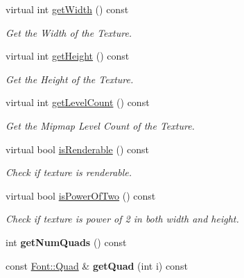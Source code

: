 \begin{DoxyCompactItemize}
\item 
virtual int \hyperlink{class_i_dream_sky_1_1_font_a29554be6eae3bf01854205b373b87d4c}{get\+Width} () const 
\begin{DoxyCompactList}\small\item\em Get the Width of the Texture. \end{DoxyCompactList}\item 
virtual int \hyperlink{class_i_dream_sky_1_1_font_a95544f5096b7b11ed4bd82e5888bf32b}{get\+Height} () const 
\begin{DoxyCompactList}\small\item\em Get the Height of the Texture. \end{DoxyCompactList}\item 
virtual int \hyperlink{class_i_dream_sky_1_1_font_ab31bc3961d87559fb2bec990eb2ea74e}{get\+Level\+Count} () const 
\begin{DoxyCompactList}\small\item\em Get the Mipmap Level Count of the Texture. \end{DoxyCompactList}\item 
virtual bool \hyperlink{class_i_dream_sky_1_1_font_a2925b8c1b04096d45cc37bcce6980599}{is\+Renderable} () const 
\begin{DoxyCompactList}\small\item\em Check if texture is renderable. \end{DoxyCompactList}\item 
virtual bool \hyperlink{class_i_dream_sky_1_1_font_af3cd04a5fad1746998deb5c8f2cb1553}{is\+Power\+Of\+Two} () const 
\begin{DoxyCompactList}\small\item\em Check if texture is power of 2 in both width and height. \end{DoxyCompactList}\item 
int {\bfseries get\+Num\+Quads} () const \hypertarget{class_i_dream_sky_1_1_font_a823b7635f9df8b86502524a00d160ec9}{}\label{class_i_dream_sky_1_1_font_a823b7635f9df8b86502524a00d160ec9}

\item 
const \hyperlink{class_i_dream_sky_1_1_font_1_1_quad}{Font\+::\+Quad} \& {\bfseries get\+Quad} (int i) const \hypertarget{class_i_dream_sky_1_1_font_aa1e6b0913b666bec5d39f791d943ad20}{}\label{class_i_dream_sky_1_1_font_aa1e6b0913b666bec5d39f791d943ad20}

\end{DoxyCompactItemize}


